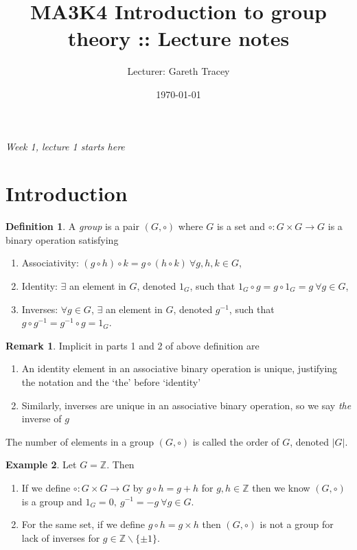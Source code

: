 \documentclass[a4paper]{article}
\title{MA3K4 Introduction to group theory :: Lecture notes}
\author{Lecturer: Gareth Tracey}
\date{\today}
\newcommand{\Z}{\mathbb{Z}}
\theoremstyle{definition}
\newtheorem{defn}{Definition}[subsection]
\newtheorem{example}[defn]{Example}
\newtheorem*{remark}{Remark}
\begin{document}
\maketitle
\thispagestyle{empty}

\tableofcontents
\thispagestyle{empty}
\newpage
\setcounter{page}{1}

\begin{flushright}
\textit{Week 1, lecture 1 starts here}
\end{flushright}

\section{Introduction}
\begin{defn}
A \textit{group} is a pair $(G,\circ)$ where $G$ is a set and $\circ:G\times G\rightarrow G$ is a binary operation satisfying
\begin{enumerate}
\item Associativity: $(g\circ h)\circ k = g\circ (h\circ k) \ \forall g,h,k \in G$,
\item Identity: $\exists$ an element in $G$, denoted $1_G$, such that $1_G\circ g = g\circ 1_G = g \ \forall g\in G$,
\item Inverses: $\forall g\in G$, $\exists$ an element in $G$, denoted $g^{-1}$, such that $g\circ g^{-1} = g^{-1}\circ g = 1_G$.
\end{enumerate}
\end{defn}

\begin{remark}
Implicit in parts 1 and 2 of above definition are
\begin{enumerate}
\item An identity element in an associative binary operation is unique, justifying the notation and the `the' before `identity'
\item Similarly, inverses are unique in an associative binary operation, so we say \textit{the} inverse of $g$
\end{enumerate}
The number of elements in a group $(G,\circ)$ is called the order of $G$, denoted $|G|$.
\end{remark}

\begin{example}
Let $G=\Z$. Then
\begin{enumerate}
\item If we define $\circ:G\times G\rightarrow G$ by $g\circ h=g+h$ for $g,h\in \Z$ then we know $(G,\circ)$ is a group and $1_G=0,\ g^{-1}=-g \ \forall g\in G$.
\item For the same set, if we define $g\circ h=g\times h$ then $(G,\circ)$ is not a group for lack of inverses for $g\in \Z \backslash \{\pm 1\}$.
\end{enumerate}
\end{example}
\end{document}
